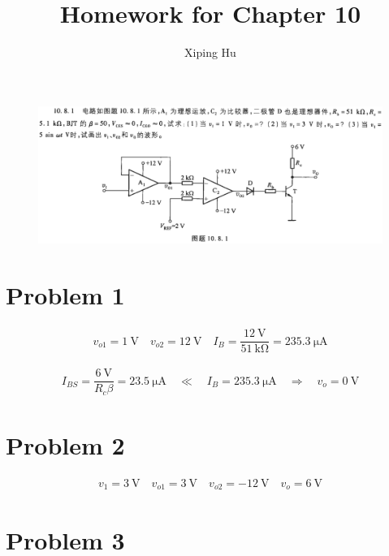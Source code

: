 \documentclass{article}
\author{Xiping Hu}
\affil{https://hxp.plus/}
\title{Homework for Chapter 10}
\newcommand{\si}[1]{\  \mathrm{#1}}
\begin{document}
\maketitle

\begin{figure}[H]
  \centering
  \includegraphics[width=\linewidth]{figures/Problem1081.png}
\end{figure}

\section{Problem 1}

\begin{equation*}
  \begin{aligned}
    v_{o1} = 1 \si{V} \quad v_{o2} = 12 \si{V} \quad I_B = \dfrac{12 \si{V}}{51 \si{k \Omega}} = 235.3 \si{\mu A}
  \end{aligned}
\end{equation*}

\begin{equation*}
  \begin{aligned}
    I_{BS} = \dfrac{6 \si{V}}{R_c \beta} = 23.5 \si{\mu A} \quad \ll \quad I_B = 235.3 \si{\mu A} \quad \Rightarrow \quad v_o = 0 \si{V}
  \end{aligned}
\end{equation*}

\section{Problem 2}

\begin{equation*}
  \begin{aligned}
    v_1 = 3 \si{V} \quad v_{o1} = 3 \si{V} \quad v_{o2} = - 12 \si{V} \quad v_o = 6 \si{V}
  \end{aligned}
\end{equation*}

\section{Problem 3}
\end{document}
